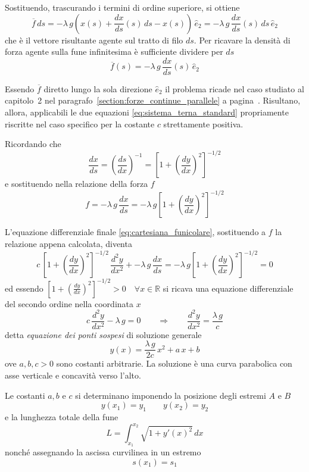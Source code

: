 Sostituendo, trascurando i termini di ordine superiore, si ottiene
\[
 \overline{f}\,ds = -\lambda\,g\left(x(s) + \dfrac{dx}{ds}(s)\,ds - x(s)\right)\,\hat{e}_2 = -\lambda\,g\,\dfrac{dx}{ds}(s)\,ds\,\hat{e}_2 
\]
che è il vettore risultante agente sul tratto di filo $ds$. Per ricavare la densità di forza agente sulla fune infinitesima è sufficiente dividere per $ds$
\[
 \overline{f}(s) = -\lambda\,g\,\dfrac{dx}{ds}(s)\,\hat{e}_2
\]

Essendo $\overline{f}$ diretto lungo la sola direzione $\hat{e}_2$ il problema ricade nel caso studiato al capitolo~2 nel paragrafo~\ref{section:forze_continue_parallele} a pagina~\pageref{section:forze_continue_parallele}. 
Risultano, allora, applicabili le due equazioni \eqref{eq:sistema_terna_standard} propriamente riscritte nel caso specifico per la costante $c$ strettamente positiva. 

Ricordando che 
\[
 \dfrac{dx}{ds} = \left(\dfrac{ds}{dx}\right)^{-1} = \left[1+\left(\dfrac{dy}{dx}\right)^2\right]^{-1/2}
\]
e sostituendo nella relazione della forza $f$
\[
 f = -\lambda\,g\,\dfrac{dx}{ds} = -\lambda\,g\left[1+\left(\dfrac{dy}{dx}\right)^2\right]^{-1/2}
\]

L'equazione differenziale finale \eqref{eq:cartesiana_funicolare}, sostituendo a $f$ la relazione appena calcolata, diventa
\begin{equation*}
 c\,\left[1+ \left(\dfrac{dy}{dx}\right)^2\right]^{-1/2}\,\dfrac{d^2 y}{dx^2} + -\lambda\,g\,\dfrac{dx}{ds} = -\lambda\,g\left[1+\left(\dfrac{dy}{dx}\right)^2\right]^{-1/2} = 0
\end{equation*}
ed essendo $\left[1+\left(\frac{dy}{dx}\right)^2\right]^{-1/2}>0\quad\forall x\in\mathbb{R}$ si ricava una equazione differenziale del secondo ordine nella coordinata $x$
\begin{equation}
 \label{eq:equazione_differenziale_ponte_sospeso}
 c\,\dfrac{d^2y}{dx^2} - \lambda\,g = 0\qquad \Longrightarrow\qquad \dfrac{d^2y}{dx^2} = \dfrac{\lambda\,g}{c}
\end{equation}
detta \emph{equazione dei ponti sospesi} di soluzione generale 
\begin{equation}
\label{eq:equazione_ponte_sospeso}
 y(x) = \dfrac{\lambda\,g}{2 c}\,x^2 + a\,x+ b
\end{equation}
ove $a,b,c >0$ sono costanti arbitrarie. La soluzione è una curva parabolica con asse verticale e concavità verso l'alto.

Le costanti $a,b$ e $c$ si determinano imponendo la posizione degli estremi $A$ e $B$
\[
 y(x_1) = y_1 \qquad y(x_2)=y_2
\]
e la lunghezza totale della fune
\[
 L = \int_{x_1}^{x_2} \sqrt{1+y'(x)^2}\,dx
\]
nonché assegnando la ascissa curvilinea in un estremo
\[
 s(x_1) = s_1
\]

